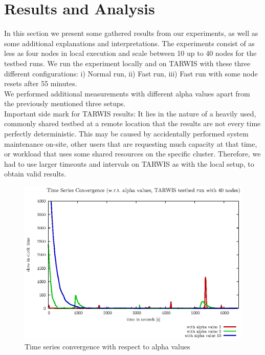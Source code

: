 \documentclass{llncs}
\begin{document}
	\section{Results and Analysis}
	In this section we present some gathered results from our experiments, as well as some additional explanations and interpretations. The experiments consist of as less as four nodes in local execution and scale between 10 up to 40 nodes for the testbed runs. We run the experiment locally and on TARWIS with these three different configurations: i) Normal run, ii) Fast run, iii) Fast run with some node resets after 55 minutes.\\
	We performed additional measurements with different alpha values apart from the previously mentioned three setups.\\
	Important side mark for TARWIS results: It lies in the nature of a heavily used, commonly shared testbed at a remote location that the results are not every time perfectly deterministic. This may be caused by accidentally performed system maintenance on-site, other users that are requesting much capacity at that time, or workload that uses some shared resources on the specific cluster. Therefore, we had to use larger timeouts and intervals on TARWIS as with the local setup, to obtain valid results.
	\begin{figure}[H]
		\centering
		\includegraphics[scale=0.6]{images/FIG_01.eps}
		\caption{Time series convergence with respect to alpha values}
		\label{fig:alpha}
	\end{figure}
	
\end{document}
